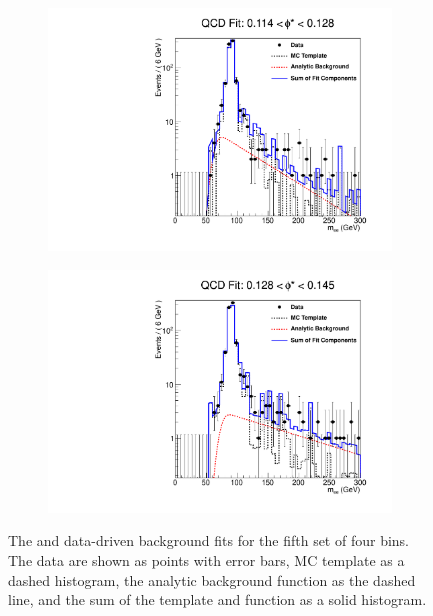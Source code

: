 \begin{figure}[!htbp]
\begin{subfigure}[b]{\SideBySidePlotWidth}
        \includegraphics[width=\linewidth]{figures/qcd_fits/qcd_fit_plot_for_19.pdf}
        \caption{}
        \label{fig:qcd_fit_19}
    \end{subfigure}%
    \begin{subfigure}[b]{\SideBySidePlotWidth}
        \includegraphics[width=\linewidth]{figures/qcd_fits/qcd_fit_plot_for_20.pdf}
        \caption{}
        \label{fig:qcd_fit_20}
    \end{subfigure}
    \caption[
       The \QCDjets and \wjets data-driven background fits for the fifth set of
       four \phistar bins.
    ]{
       The \QCDjets and \wjets data-driven background fits for the fifth set of
       four \phistar bins. The data are shown as points with error bars, MC
       template as a dashed histogram, the analytic background function as the
       dashed line, and the sum of the template and function as a solid
       histogram.
    }
    \label{fig:qcd_many_5}
\end{figure}

